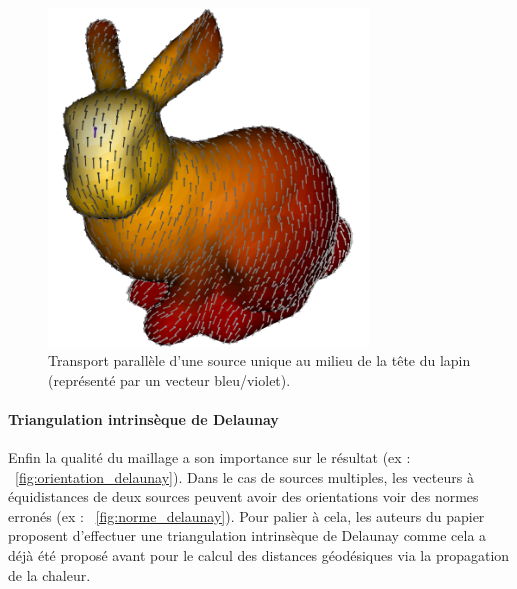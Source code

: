 \documentclass[11pt]{article}
\begin{document}
	\begin{figure}
		\centering
		\includegraphics[width=8.5cm]{parallel_transport.png}
		\caption{Transport parallèle d'une source unique au milieu de la tête du lapin (représenté par un vecteur bleu/violet).}
		\label{fig:parallel}
	\end{figure}
	
	
	\paragraph{Triangulation intrinsèque de Delaunay}
	Enfin la qualité du maillage a son importance sur le résultat (ex : \figurename~\ref{fig:orientation_delaunay}). Dans le cas de sources multiples, les vecteurs à équidistances de deux sources peuvent avoir des orientations voir des normes erronés (ex : \figurename~\ref{fig:norme_delaunay}). Pour palier à cela, les auteurs du papier proposent d'effectuer une triangulation intrinsèque de Delaunay comme cela a déjà été proposé avant pour le calcul des distances géodésiques via la propagation de la chaleur.
	
\end{document}
